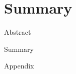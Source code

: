 \chapter{Summary}
\begin{compactitem}
	\item Abstract
	\item Summary
	\item Appendix
\end{compactitem}